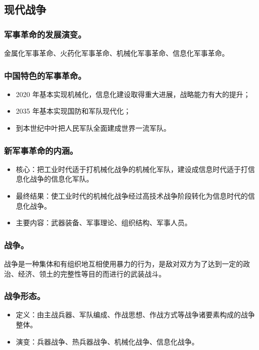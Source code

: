 \documentclass{article}
\begin{document}
\subsection{现代战争}

\subsubsection{军事革命的发展演变。}
金属化军事革命、火药化军事革命、机械化军事革命、信息化军事革命。

\subsubsection{中国特色的军事革命。}
\begin{itemize}
    \item 2020 年基本实现机械化，信息化建设取得重大进展，战略能力有大的提升；
    \item 2035 年基本实现国防和军队现代化；
    \item 到本世纪中叶把人民军队全面建成世界一流军队。
\end{itemize}

\subsubsection{新军事革命的内涵。}
\begin{itemize}
    \item 核心：把工业时代适于打机械化战争的机械化军队，建设成信息时代适于打信息化战争的信息化军队。
    \item 最终结果：使工业时代的机械化战争经过高技术战争阶段转化为信息时代的信息化战争。
    \item 主要内容：武器装备、军事理论、组织结构、军事人员。
\end{itemize}

\subsubsection{战争。}
战争是一种集体和有组织地互相使用暴力的行为，是敌对双方为了达到一定的政治、经济、领土的完整性等目的而进行的武装战斗。

\subsubsection{战争形态。}
\begin{itemize}
    \item 定义：由主战兵器、军队编成、作战思想、作战方式等战争诸要素构成的战争整体。
    \item 演变：兵器战争、热兵器战争、机械化战争、信息化战争。
\end{itemize}
\end{document}
